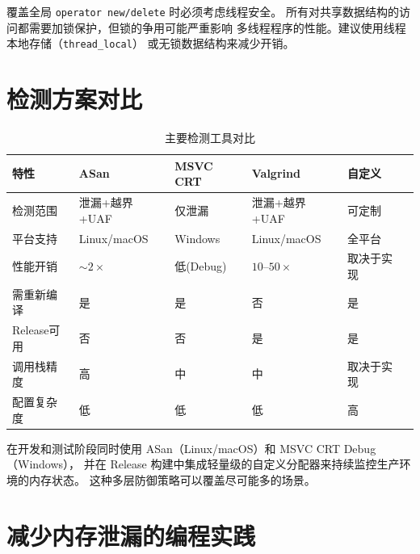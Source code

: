 \documentclass[12pt,a4paper,fontset=fandol]{ctexbook}
\begin{document}
\begin{warning}[title={线程安全}]
覆盖全局 \texttt{operator new/delete} 时必须考虑线程安全。
所有对共享数据结构的访问都需要加锁保护，但锁的争用可能严重影响
多线程程序的性能。建议使用线程本地存储（\texttt{thread\_local}）
或无锁数据结构来减少开销。
\end{warning}


\section{检测方案对比}

\begin{table}[htbp]
\centering
\caption{主要检测工具对比}
\label{tab:comparison}
\begin{tabularx}{\textwidth}{l>{\raggedright\arraybackslash}X>{\raggedright\arraybackslash}X>{\raggedright\arraybackslash}X>{\raggedright\arraybackslash}X>{\raggedright\arraybackslash}X}
\toprule
\textbf{特性} & \textbf{ASan} & \textbf{MSVC CRT} & \textbf{Valgrind} & \textbf{自定义} \\
\midrule
检测范围    & 泄漏+越界+UAF & 仅泄漏    & 泄漏+越界+UAF & 可定制       \\
平台支持    & Linux/macOS   & Windows   & Linux/macOS   & 全平台       \\
性能开销    & $\sim2\times$ & 低(Debug) & $10$--$50\times$ & 取决于实现 \\
需重新编译  & 是            & 是        & 否            & 是           \\
Release可用 & 否            & 否        & 是            & 是           \\
调用栈精度  & 高            & 中        & 中            & 取决于实现   \\
配置复杂度  & 低            & 低        & 低            & 高           \\
\bottomrule
\end{tabularx}
\end{table}

\begin{note}[title={推荐策略}]
在开发和测试阶段同时使用 ASan（Linux/macOS）和 MSVC CRT Debug（Windows），
并在 Release 构建中集成轻量级的自定义分配器来持续监控生产环境的内存状态。
这种多层防御策略可以覆盖尽可能多的场景。
\end{note}


\section{减少内存泄漏的编程实践}
\end{document}
